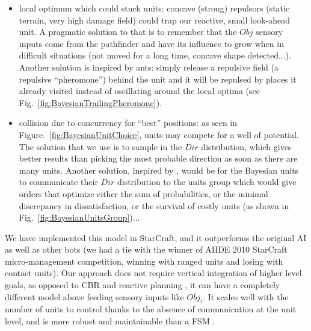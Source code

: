 \begin{itemize}
    \item local optimum which could stuck units: concave (strong) repulsors (static terrain, very high damage field) could trap our reactive, small look-ahead unit. A pragmatic solution to that is to remember that the $Obj$ sensory inputs come from the pathfinder and have its influence to grow when in difficult situations (not moved for a long time, concave shape detected...). Another solution is inspired by ants: simply release a repulsive field (a repulsive ``pheromone'') behind the unit and it will be repulsed by places it already visited instead of oscillating around the local optima (see Fig.~\ref{fig:BayesianTrailingPheromone}).
    \item collision due to concurrency for ``best'' positions: as seen in Figure.~\ref{fig:BayesianUnitChoice}, units may compete for a well of potential. The solution that we use is to sample in the $Dir$ distribution, which gives better results than picking the most probable direction as soon as there are many units. Another solution, inspired by \citep{Marthi05concurrenthierarchical}, would be for the Bayesian units to communicate their $Dir$ distribution to the units group which would give orders that optimize either the sum of probabilities, or the minimal discrepancy in dissatisfaction, or the survival of costly units (as shown in Fig.~\ref{fig:BayesianUnitsGroup})...
\end{itemize}


We have implemented this model in StarCraft, and it outperforms the original AI as well as other bots (we had a tie with the winner of AIIDE 2010 StarCraft micro-management competition, winning with ranged units and losing with contact units). Our approach does not require vertical integration of higher level goals, as opposed to CBR and reactive planning \citep{Ontanon2007,WeberCIG10}, it can have a completely different model above feeding sensory inputs like $Obj_i$. It scales well with the number of units to control thanks to the absence of communication at the unit level, and is more robust and maintainable than a FSM \citep{FSM}.


